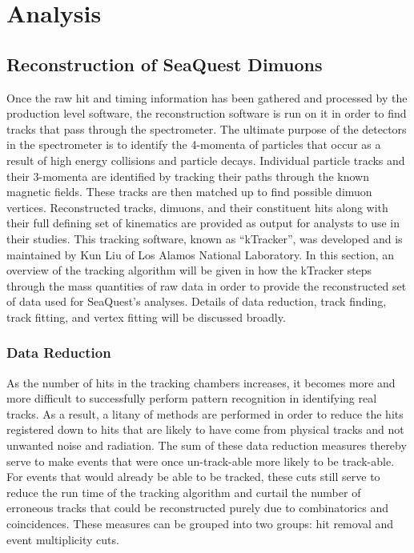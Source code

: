 \chapter{Analysis}


\section{Reconstruction of SeaQuest Dimuons}

Once the raw hit and timing information has been gathered and processed by the production level software, the reconstruction software is run on it in order to find tracks that pass through the spectrometer. The ultimate purpose of the detectors in the spectrometer is to identify the 4-momenta of particles that occur as a result of high energy collisions and particle decays. Individual particle tracks and their 3-momenta are identified by tracking their paths through the known magnetic fields.  These tracks are then matched up to find possible dimuon vertices. Reconstructed tracks, dimuons, and their constituent hits along with their full defining set of kinematics are provided as output for analysts to use in their studies. This tracking software, known as ``kTracker'', was developed and is maintained by Kun Liu of Los Alamos National Laboratory.  In this section, an overview of the tracking algorithm will be given in how the kTracker steps through the mass quantities of raw data in order to provide the reconstructed set of data used for SeaQuest's analyses. Details of data reduction, track finding, track fitting, and vertex fitting will be discussed broadly. 

\subsection{Data Reduction}

As the number of hits in the tracking chambers increases, it becomes more and more difficult to successfully perform pattern recognition in identifying real tracks. As a result, a litany of methods are performed in order to reduce the hits registered down to hits that are likely to have come from physical tracks and not unwanted noise and radiation. The sum of these data reduction measures thereby serve to make events that were once un-track-able more likely to be track-able. For events that would already be able to be tracked, these cuts still serve to reduce the run time of the tracking algorithm and curtail the number of erroneous tracks that could be reconstructed purely due to combinatorics and coincidences. These measures can be grouped into two groups: hit removal and event multiplicity cuts.

